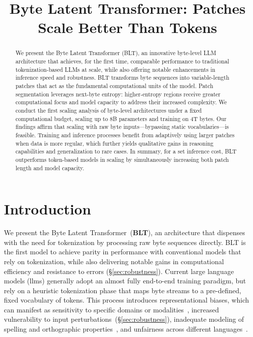 \title{Byte Latent Transformer: Patches Scale Better Than Tokens}

\begin{abstract}
We present the Byte Latent Transformer ({\textsc BLT}), an innovative byte-level LLM architecture that achieves, for the first time, comparable performance to traditional tokenization-based LLMs at scale, while also offering notable enhancements in inference speed and robustness. 
{\textsc BLT} transforms byte sequences into variable-length patches that act as the fundamental computational units of the model. Patch segmentation leverages next-byte entropy: higher-entropy regions receive greater computational focus and model capacity to address their increased complexity. We conduct the first scaling analysis of byte-level architectures under a fixed computational budget, scaling up to 8B parameters and training on 4T bytes. Our findings affirm that scaling with raw byte inputs—bypassing static vocabularies—is feasible. Training and inference processes benefit from adaptively using larger patches when data is more regular, which further yields qualitative gains in reasoning capabilities and generalization to rare cases. In summary, for a set inference cost, {\textsc BLT} outperforms token-based models in scaling by simultaneously increasing both patch length and model capacity.
\end{abstract}

\section{Introduction}
\label{section:intro}

We present the Byte Latent Transformer~(\textbf{BLT}), an architecture that dispenses with the need for tokenization by processing raw byte sequences directly. BLT is the first model to achieve parity in performance with conventional models that rely on tokenization, while also delivering notable gains in computational efficiency and resistance to errors (\S\ref{sec:robustness}). Current large language models (llms) generally adopt an almost fully end-to-end training paradigm, but rely on a heuristic tokenization phase that maps byte streams to a pre-defined, fixed vocabulary of tokens. This process introduces representational biases, which can manifest as sensitivity to specific domains or modalities~\citep{dagangetting}, increased vulnerability to input perturbations~(\S\ref{sec:robustness}), inadequate modeling of spelling and orthographic properties~\citep{edman2024cute}, and unfairness across different languages~\citep{liang2023xlm,petrov2024language,limisiewicz2024myte}.

